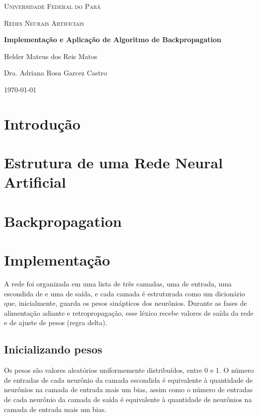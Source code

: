 \documentclass[12pt,a4paper]{article}
\begin{document}
\begin{titlepage}
	\centering
	{\scshape\LARGE Universidade Federal do Pará \par}
	\vspace{1cm}
	{\scshape\Large Redes Neurais Artificiais\par}
	\vspace{1.5cm}
	{\huge\bfseries Implementação e Aplicação de Algoritmo de Backpropagation\par}
	\vspace{2cm}
	{\Large Helder Mateus dos Reis Matos\par}
	\vfill
	Dra. Adriana Rosa Garcez Castro
	\vfill
	{\large \today\par}
\end{titlepage}

\tableofcontents

\section{Introdução}

\section{Estrutura de uma Rede Neural Artificial}

\section{Backpropagation}

\section{Implementação}
A rede foi organizada em uma lista de três camadas, uma de entrada, uma escondida de e uma de saída, e cada camada é estruturada como um dicionário que, inicialmente, guarda os pesos sinápticos dos neurônios. Durante as fases de alimentação adiante e retropropagação, esse léxico recebe valores de saída da rede e de ajuste de pesos (regra delta).

\subsection{Inicializando pesos}
Os pesos são valores aleatórios uniformemente distribuídos, entre 0 e 1. O número de entradas de cada neurônio da camada escondida é equivalente à quantidade de neurônios na camada de entrada mais um bias, assim como o número de entradas de cada neurônio da camada de saída é equivalente à quantidade de neurônios na camada de entrada mais um bias.

\end{document}
